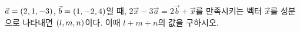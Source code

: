 $\vec{a}=(2{,}\mkern3mu\mathopen{}1{,}\mkern3mu\mathopen{}-3)$, $\vec{b}=(1{,}\mkern3mu\mathopen{}-2{,}\mkern3mu\mathopen{}4)$일 때, $2\vec{x}-3\vec{a}=2\vec{b}+\vec{x}$를 만족시키는 벡터 $\vec{x}$를 성분으로 나타내면 $(l{,}\mkern3mu\mathopen{}m{,}\mkern3mu\mathopen{}n)$이다. 이때 $l+m+n$의 값을 구하시오.
